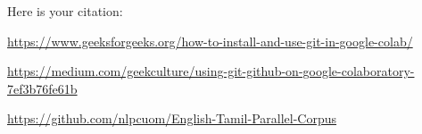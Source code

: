 \documentclass{article}
\begin{document}
Here is your citation:

\begin{thebibliography}{99}

\url{https://www.geeksforgeeks.org/how-to-install-and-use-git-in-google-colab/}

\url{https://medium.com/geekculture/using-git-github-on-google-colaboratory-7ef3b76fe61b}

\url{https://github.com/nlpcuom/English-Tamil-Parallel-Corpus}

\end{thebibliography}
\end{document}
